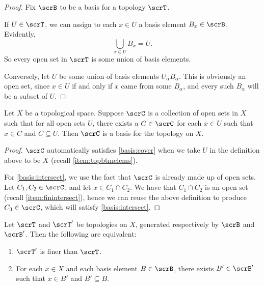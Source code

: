 \documentclass{article}
\begin{document}
\begin{proof}
    Fix $\scrB$ to be a basis for a topology $\scrT$.

    If $U \in \scrT$, we can assign to each $x \in U$ a basis element $B_x \in \scrB$. Evidently,
    \[
        \bigcup_{x \in U} B_x = U.
    \]
    So every open set in $\scrT$ is some union of basis elements.

    Conversely, let $U$ be some union of basis elements $U_\alpha B_\alpha$.
    This is obviously an open set, since $x \in U$ if and only if $x$ came from some $B_\alpha$, and every such $B_\alpha$ will be a subset of $U$.
\end{proof}

\begin{lemma}\label{lem:basisfromsubcollection}
    Let $X$ be a topological space.
    Suppose $\scrC$ is a collection of open sets in $X$ such that for all open sets $U$, there exists a $C \in \scrC$ for each $x \in U$ such that $x \in C$ and $C \subseteq U$.
    Then $\scrC$ is a basis for the topology on $X$.
\end{lemma}

\begin{proof}
    $\scrC$ automatically satisfies \ref{basis:cover} when we take $U$ in the definition above to be $X$ (recall \ref{item:topbtmelems}).

    For \ref{basis:intersect}, we use the fact that $\scrC$ is already made up of open sets.
    Let $C_1, C_2 \in \scrC$, and let $x \in C_1 \cap C_2$.
    We have that $C_1 \cap C_2$ is an open set (recall \ref{item:finintersect}), hence we can reuse the above definition to produce $C_3 \in \scrC$, which will satisfy \ref{basis:intersect}.
\end{proof}

\begin{lemma}\label{lem:finerbasis}
    Let $\scrT$ and $\scrT'$ be topologies on $X$, generated respectively by $\scrB$ and $\scrB'$.
    Then the following are equivalent:
    \begin{enumerate}[label=(\arabic*)]
        \item $\scrT'$ is finer than $\scrT$. \label{basisfiner1}
        \item For each $x \in X$ and each basis element $B \in \scrB$, there exists $B' \in \scrB'$ such that $x \in B'$ and $B' \subseteq B$. \label{basisfiner2}
    \end{enumerate}
\end{lemma}
\end{document}
